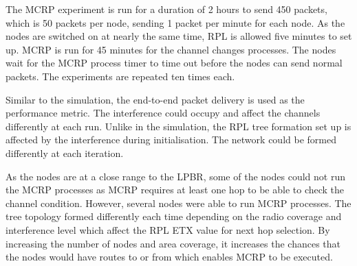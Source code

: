
The MCRP experiment is run for a duration of 2 hours to send 450 packets, which is 50 packets per node, sending 1 packet per minute for each node. As the nodes are switched on at nearly the same time, RPL is allowed five minutes to set up. MCRP is run for 45 minutes for the channel changes processes. The nodes wait for the MCRP process timer to time out before the nodes can send normal packets. 
The experiments are repeated ten times each. %



Similar to the simulation, the end-to-end packet delivery is used as the performance metric.
The interference could occupy and affect the channels differently at each run. Unlike in the simulation, the RPL tree formation set up is affected by the interference during initialisation. The network could be formed differently at each iteration.

As the nodes are at a close range to the LPBR, some of the nodes could not run the MCRP processes as MCRP requires at least one hop to be able to check the channel condition. However, several nodes were able to run MCRP processes. The tree topology formed differently each time depending on the radio coverage and interference level which affect the RPL ETX value for next hop selection. By increasing the number of nodes and area coverage, it increases the chances that the nodes would have routes to or from which enables MCRP to be executed.

